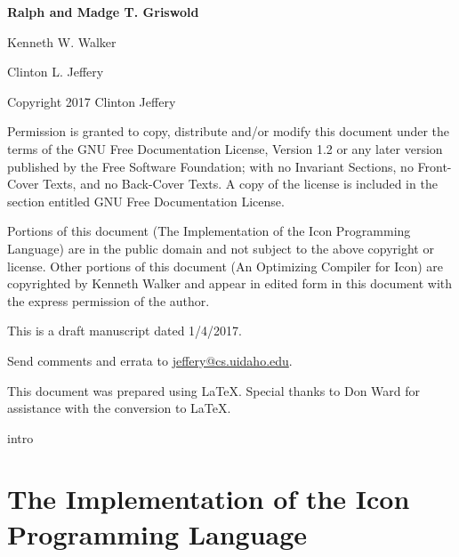 \documentclass[letterpaper,twoside,12pt]{book}
\begin{document}
\bigskip
\bigskip
\bigskip
\bigskip
\bigskip
\bigskip
\bigskip

{\raggedleft\bfseries\Large
Ralph and Madge T. Griswold
\par
Kenneth W. Walker
\par
Clinton L. Jeffery 
\par}

\bigskip
\bigskip
\bigskip

\clearpage\setcounter{page}{1}\pagestyle{KonvertFolgeii}
\frontmatter
\bigskip
\bigskip
\noindent Copyright {\textcopyright} 2017 Clinton Jeffery


\noindent Permission is granted to copy, distribute and/or modify this
document under the terms of the GNU Free Documentation License,
Version 1.2 or any later version published by the Free Software
Foundation; with no Invariant Sections, no Front-Cover Texts, and no
Back-Cover Texts. A copy of the license is included in the section
entitled {\textquotedbl}GNU Free Documentation License{\textquotedbl}.


Portions of this document ({\textquotedbl}The Implementation of the
Icon Programming Language{\textquotedbl}) are in the public domain and
not subject to the above copyright or license. Other portions of this
document ({\textquotedbl}An Optimizing Compiler for
Icon{\textquotedbl}) are copyrighted by Kenneth Walker and appear in
edited form in this document with the express permission of the
author.


\bigskip


\noindent This is a draft manuscript dated 1/4/2017.

\noindent Send comments and errata to
\href{mailto:jeffery@cs.uidaho.edu}{jeffery@cs.uidaho.edu}.

\bigskip

\noindent This document was prepared using \LaTeX. Special thanks to Don Ward
for assistance with the conversion to \LaTeX.

\setcounter{tocdepth}{3}
\tableofcontents


\mainmatter
 {intro}

\part{The Implementation of the Icon Programming Language}













\end{document}
